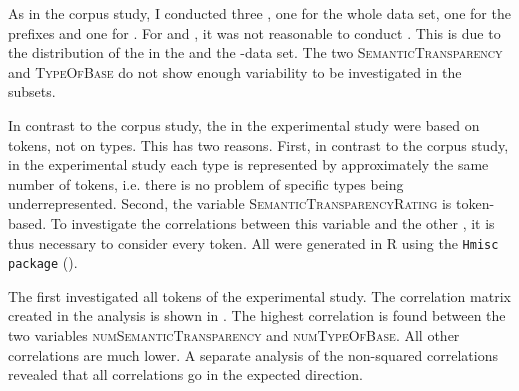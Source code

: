 As in the corpus study, I conducted three , one for the whole data set, one for the prefixes and one for .  
For  and , it was not reasonable to conduct . This is due to the distribution of the  in the  and the -data set. The two  \textsc{SemanticTransparency} and \textsc{TypeOfBase} do not show enough variability to be investigated in the subsets. 


 In contrast to the corpus study, the  in the experimental study were based on tokens, not on types. This has two reasons. First, in contrast to the corpus study, in the experimental study each type is represented by approximately the same number of tokens, i.e. there is no problem of specific types being underrepresented. Second, the variable \textsc{SemanticTransparencyRating} is token-based. To investigate the correlations between this variable and the other , it is thus necessary to consider every token.
All  were generated in R using the \texttt{Hmisc package} (\citealt{Harrell.2017}).

   The first  investigated all tokens of the experimental  study. The correlation matrix created in the analysis is shown in . 
   The highest correlation is found between the two variables \textsc{numSemanticTransparency} and \textsc{numTypeOfBase}. All other correlations are much lower. A separate analysis of the non-squared correlations revealed that all correlations go in the expected direction. 
   
   


